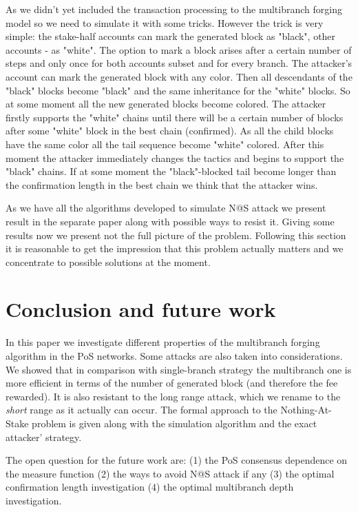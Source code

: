 \documentclass[12pt]{article}
\begin{document}
As we didn't yet included the transaction processing to the multibranch forging model so we need to simulate it with some tricks. However the trick is very simple:
the stake-half accounts can mark the generated block as "black", other accounts \-- as "white". 
The option to mark a block arises after a certain number of steps and only once for both accounts subset and for every branch. The attacker's account 
can mark the generated block with any color. Then all descendants of the "black" blocks become "black" and the same inheritance for the "white" blocks. So at 
some moment all the new generated blocks become colored. The attacker firstly supports the "white" chains until there  will be a certain number of blocks 
after some "white" block in the best chain (confirmed). As all the child blocks have the same color all the tail sequence become "white" colored. 
After this moment the 
attacker immediately changes the tactics and begins to support the "black" chains. If at some moment the "black"-blocked tail become longer than the confirmation 
length in the best chain we think that the attacker wins.        

As we have all the algorithms developed to simulate N@S attack we present result in the separate paper along with possible ways to resist it. Giving some results
now we present not the full picture of the problem. Following this section it is reasonable to get the impression that this problem actually matters and 
we concentrate to possible solutions at the moment. 

\section{Conclusion and future work}
In this paper we investigate different properties of the multibranch forging algorithm in the PoS networks. Some attacks are also taken into considerations.
We showed that in comparison with single-branch strategy the multibranch one is more efficient in terms of the number of generated block (and therefore 
the fee rewarded). It is also resistant to the long range attack, which we rename to the {\it short} range as it actually can occur. The formal approach
to the Nothing-At-Stake problem is given along with the simulation algorithm and the exact attacker' strategy.

The open question for the future work are: (1) the PoS consensus dependence on the measure function (2) the ways to avoid N@S attack if any 
(3) the optimal confirmation length investigation (4) the optimal multibranch depth investigation.     
\end{document}
